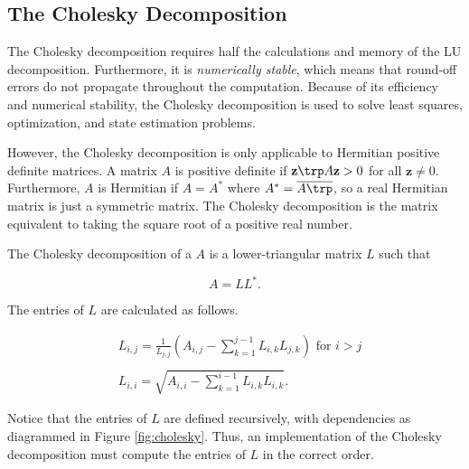 \subsection*{The Cholesky Decomposition} %
The Cholesky decomposition requires half the calculations and memory of the LU decomposition. 
Furthermore, it is \emph{numerically stable}, which means that round-off errors do not propagate throughout the computation. 
Because of its efficiency and numerical stability, the Cholesky decomposition is used to solve least squares, optimization, and state estimation problems.

However, the Cholesky decomposition is only applicable to Hermitian positive definite matrices. 
A matrix $A$ is positive definite if  $\mathbf{z}\trp A\mathbf{z} > 0$ for all $\mathbf{z} \neq 0$. 
Furthermore, $A$ is Hermitian if $A = A^*$ where $A^* = \overline{A\trp }$, so a real Hermitian matrix is just a symmetric matrix. 
The Cholesky decomposition is the matrix equivalent to taking the square root of a positive real number.

The Cholesky decomposition of a $A$ is a lower-triangular matrix $L$ such that

\begin{equation*}
 A = LL^*.
\end{equation*}

The entries of $L$ are calculated as follows.

\begin{align*}
&L_{i,j} = \frac{1}{L_{j,j}}\left(A_{i,j} -\sum_{k=1}^{j-1}{L_{i,k}L_{j,k}}\right) \mbox{ for $i>j$} \\ \\
&L_{i,i} = \sqrt{A_{i,i} - \sum_{k=1}^{i-1}{L_{i,k}L_{i,k}}}.
\end{align*}

Notice that the entries of $L$ are defined recursively, with dependencies as diagrammed in Figure \ref{fig:cholesky}. 
Thus, an implementation of the Cholesky decomposition must compute the entries of $L$ in the correct order.

